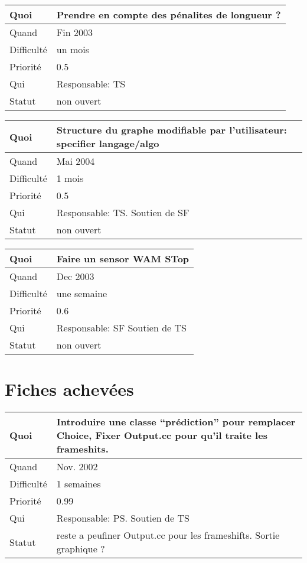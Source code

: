 \documentclass[a4paper,11pt]{article}
\begin{document}
\begin{longtable}{|l|p{7cm}|}\hline
  Quoi & Prendre en compte des p\'enalites de longueur ?\\\hline
  Quand  &  Fin 2003\\\hline
  Difficult\'e &  un mois \\\hline
  Priorit\'e & 0.5 \\\hline
  Qui & Responsable: TS\\\hline
  Statut & non ouvert\\\hline
\end{longtable}

\begin{longtable}{|l|p{7cm}|}\hline
  Quoi & Structure du graphe modifiable par l'utilisateur: specifier
langage/algo \\\hline
  Quand   & Mai 2004 \\\hline
  Difficult\'e & 1 mois \\\hline
  Priorit\'e &  0.5\\\hline
  Qui & Responsable: TS. Soutien de SF\\\hline
  Statut & non ouvert\\\hline
\end{longtable}

\begin{longtable}{|l|p{7cm}|}\hline
  Quoi & Faire un sensor WAM STop\\\hline
  Quand  &  Dec 2003\\\hline
  Difficult\'e & une semaine\\\hline
  Priorit\'e &  0.6\\\hline
  Qui & Responsable: SF  Soutien de TS\\\hline
  Statut & non ouvert\\\hline
\end{longtable}

\section{Fiches achev\'ees}
 
\begin{longtable}{|l|p{7cm}|}\hline
  Quoi & Introduire une classe ``pr\'ediction'' pour remplacer Choice, Fixer Output.cc pour qu'il traite les frameshits.\\\hline
  Quand  &  Nov. 2002\\\hline
  Difficult\'e &  1 semaines\\\hline
  Priorit\'e & 0.99 \\\hline
  Qui & Responsable: PS. Soutien de TS\\\hline
  Statut & reste a peufiner Output.cc pour les frameshifts. Sortie graphique ?\\\hline
\end{longtable}
\end{document}
